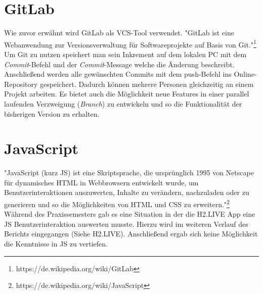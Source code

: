 \section{GitLab}
Wie zuvor erw\"ahnt wird GitLab als VCS-Tool verwendet. "GitLab ist eine Webanwendung zur Versionsverwaltung f\"ur Softwareprojekte auf Basis von Git."\footnote{https://de.wikipedia.org/wiki/GitLab} Um Git zu nutzen speichert man sein Inkrement auf dem lokalen PC mit dem \textit{Commit}-Befehl und der \textit{Commit}-Message welche die \"Anderung beschreibt. Anschlie\ss{}end werden alle gew\"unschten Commits mit dem push-Befehl ins Online-Repository gespeichert. Dadurch k\"onnen mehrere Personen gleichzeitig an einem Projekt arbeiten. Es bietet auch die M\"oglichkeit neue Features in einer parallel laufenden Verzweigung (\textit{Branch}) zu entwickeln und so die Funktionalit\"at der bisherigen Version zu erhalten. 

\section{JavaScript}
"JavaScript (kurz JS) ist eine Skriptsprache, die urspr\"unglich 1995 von Netscape f\"ur dynamisches HTML in Webbrowsern entwickelt wurde, um Benutzerinteraktionen auszuwerten, Inhalte zu ver\"andern, nachzuladen oder zu generieren und so die M\"oglichkeiten von HTML und CSS zu erweitern."\footnote{https://de.wikipedia.org/wiki/JavaScript}
W\"ahrend des Praxissemesters gab es eine Situation in der die H2.LIVE App eine JS Benutzerinteraktion auswerten musste. Hierzu wird im weiteren Verlauf des Berichts eingegangen (Siehe H2.LIVE). Anschlie\ss{}end ergab sich keine M\"oglichkeit die Kenntnisse in JS zu vertiefen.

